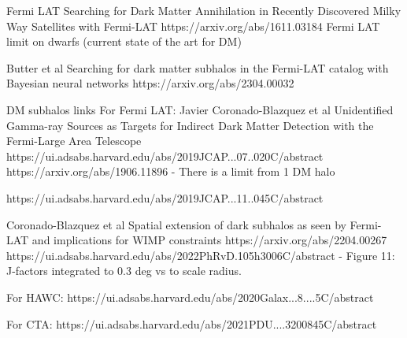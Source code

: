 Fermi LAT
Searching for Dark Matter Annihilation in Recently Discovered Milky Way Satellites with Fermi-LAT
https://arxiv.org/abs/1611.03184
Fermi LAT limit on dwarfs (current state of the art for DM)

Butter et al
Searching for dark matter subhalos in the Fermi-LAT catalog with Bayesian neural networks
https://arxiv.org/abs/2304.00032



DM subhalos links
For Fermi LAT:
Javier Coronado-Blazquez et al
Unidentified Gamma-ray Sources as Targets for Indirect Dark Matter Detection with the Fermi-Large Area Telescope
https://ui.adsabs.harvard.edu/abs/2019JCAP...07..020C/abstract
https://arxiv.org/abs/1906.11896
- There is a limit from 1 DM halo

https://ui.adsabs.harvard.edu/abs/2019JCAP...11..045C/abstract

Coronado-Blazquez et al
Spatial extension of dark subhalos as seen by Fermi-LAT and implications for WIMP constraints
https://arxiv.org/abs/2204.00267
https://ui.adsabs.harvard.edu/abs/2022PhRvD.105h3006C/abstract
- Figure 11: J-factors integrated to 0.3 deg vs to scale radius.

For HAWC: https://ui.adsabs.harvard.edu/abs/2020Galax...8....5C/abstract

For CTA: https://ui.adsabs.harvard.edu/abs/2021PDU....3200845C/abstract
